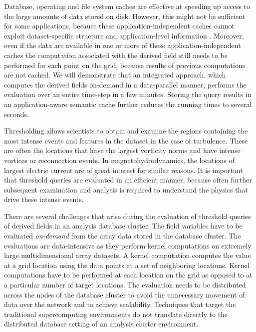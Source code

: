\documentclass{sig-alternate}
\begin{document}

Database, operating and file system caches are effective at speeding up access to the large amounts of data stored on disk. However, this might not be
sufficient for some applications, because these application-independent caches cannot exploit dataset-specific structure and application-level
information \cite{Lopez}. Moreover, even if the data are available in one or more of these application-independent caches the computation associated 
with the derived field still needs to be performed for each point on the grid, because results of previous computations are not cached. 
We will demonstrate that an integrated approach, which computes the derived fields on-demand in a data-parallel manner, performs the evaluation over 
an entire time-step in a few minutes. Storing the query results in an application-aware semantic cache further reduces the running times to several 
seconds.

Thresholding allows scientists to obtain and examine the regions containing the most intense events and features in the dataset in the case of turbulence. 
These are often the locations that have the largest vorticity norms and have intense vortices or reconnection events. 
In magnetohydrodynamics, the locations of largest electric current are of great interest for similar reasons.
It is important that threshold queries are evaluated in an efficient manner, because often further subsequent examination
and analysis is required to understand the physics that drive these intense events. 

There are several challenges that arise during the evaluation of threshold queries of derived fields in an analysis database cluster. 
The field variables have to be evaluated \emph{on-demand} from the array data stored in the database cluster. 
The evaluations are data-intensive as they perform kernel computations on extremely large multidimensional array datasets. 
A kernel computation computes the value at a grid location using the data points at a set of neighboring locations.
Kernel computations have to be performed at each location on the grid as opposed to at a particular number of target locations. 
The evaluation needs to be distributed across the nodes of the database cluster to avoid the unnecessary movement of data over 
the network and to achieve scalability.
Techniques that target the traditional supercomputing environments do not translate directly to the 
distributed database setting of an analysis cluster environment. 
\end{document}
